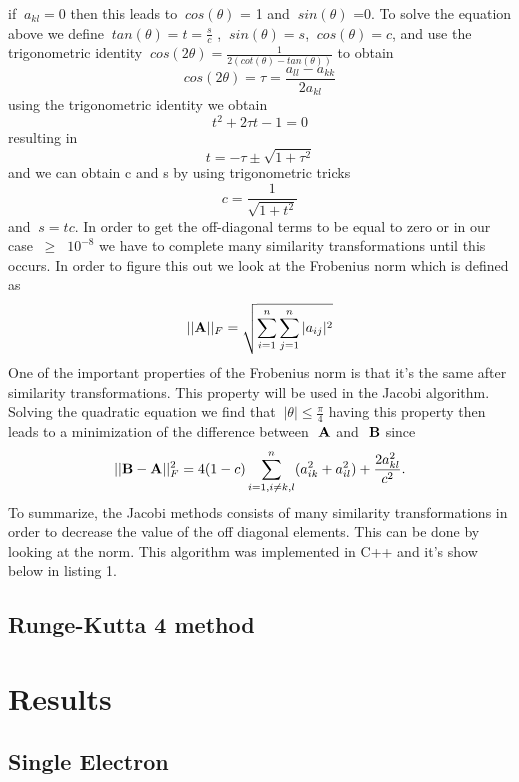 \documentclass[11pt,a4wide]{article}
\begin{document}
if $\ a_{kl}=0$ then this leads to $\ cos(\theta)$ = 1 and $\ sin(\theta)$ =0. To solve the equation above we define $\ tan(\theta)=t =\frac{s}{c}$ , $\ sin(\theta) =s$, $\ cos(\theta) = c$, and use the trigonometric identity $\ cos(2\theta)=\frac{1}{2(cot(\theta)-tan(\theta))}$ to obtain
\[
	cos(2\theta)=\tau= \frac{a_{ll} -a_{kk}}{2a_{kl}}
\]
using the trigonometric identity we obtain 
\[
	t^2 +2\tau t- 1=0
\]
resulting in 
\[
	t = -\tau \pm \sqrt{1+\tau^2}
\]
and we can obtain c and s by using trigonometric tricks 
\[
	c = \frac{1}{\sqrt{1+t^2}}
\]
and $\ s=tc $. In order to get the off-diagonal terms to be equal to zero or in our case  $\ \geq $ $\ 10^{-8}$ we have to complete many similarity transformations until this occurs. In order to figure this out we look at the Frobenius norm which is defined as 
\[
	||{\bf A}||_F = \sqrt{\sum_{i=1}^n \sum_{j=1}^n |a_{ij}|^2}
\]
One of the important properties of the Frobenius norm is that it's the same after similarity transformations. This property will be  used in the Jacobi algorithm. Solving the quadratic equation we find that $\ |\theta| \leq \frac{\pi}{4}$ having this property then leads to a minimization of the difference between $\ {\bf A}$ and $\ {\bf B}$ since 
\[
||{\bf B}-{\bf A}||_F^2=4(1-c)\sum_{i=1,i\ne k,l}^n(a_{ik}^2+a_{il}^2) +\frac{2a_{kl}^2}{c^2}.
\]
To summarize, the Jacobi methods consists of many similarity transformations in order to decrease the value of the off diagonal elements. This can be done by looking at the  norm. This algorithm was implemented in C++ and it's show below in listing 1. 


\subsection{Runge-Kutta 4 method}


\section{Results}
\subsection{Single Electron} 
\end{document}
